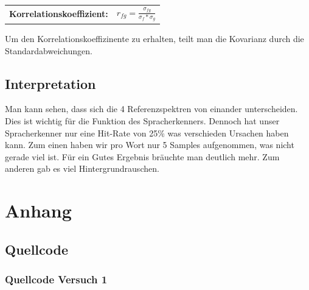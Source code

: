 \documentclass[12pt, oneside, a4paper, \docLanguage]{report}
\begin{document}
\begin{normalsize}
\begin{center}
	\begin{tabular}{ l l }
	\textbf{Korrelationskoeffizient:} & $r_{fg} = \frac{\sigma_{fg}} {\sigma_f * \sigma_g}$ \\
	\end{tabular}
\end{center}

Um den Korrelationskoeffizinente zu erhalten, teilt man die Kovarianz durch die Standardabweichungen.

\end{normalsize}

\pagebreak

\section{Interpretation}
\label{chap:VERSUCH_2_INTERPRETATION}
\begin{normalsize}
Man kann sehen, dass sich die 4 Referenzspektren von einander unterscheiden. Dies ist wichtig für die Funktion des Spracherkenners.\newline
Dennoch hat unser Spracherkenner nur eine Hit-Rate von 25\% was verschieden Ursachen haben kann. Zum einen haben wir pro Wort nur 5 Samples
aufgenommen, was nicht gerade viel ist. Für ein Gutes Ergebnis bräuchte man deutlich mehr. Zum anderen gab es viel Hintergrundrauschen.
\end{normalsize}

%
%
\renewcommand\thesection{A.\arabic{section}}
\renewcommand\thesubsection{\thesection.\arabic{subsection}}

\chapter*{Anhang}
\label{chap:APPENDIX}
\setcounter{chapter}{0}
\addtocounter{chapter}{1}
\setcounter{section}{0}

\section{Quellcode}
\label{chap:APPENDIX_SOURCECODE}

\subsection{Quellcode Versuch 1}
\label{chap:APPENDIX_SOURCECODE_V1}




\pagebreak
\end{document}

